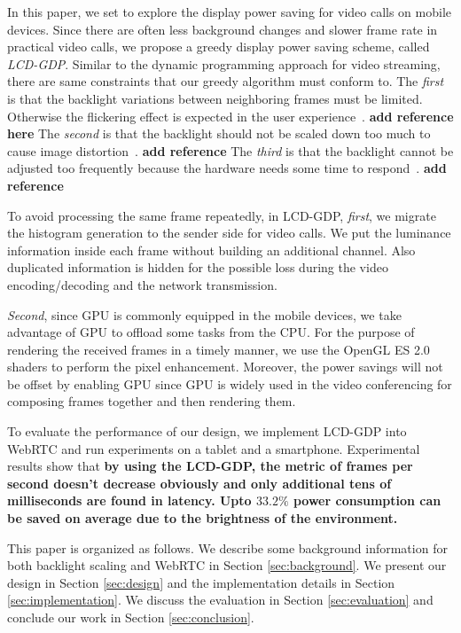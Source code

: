 In this paper, we set to explore the display power saving for video
calls on mobile devices. Since there are often less background changes
and slower frame rate in practical video calls, we propose a greedy
display power saving scheme, called {\it LCD-GDP}.  Similar to the dynamic programming
approach for video streaming, there are same constraints that our
greedy algorithm must conform to. The {\it first} is that the backlight
variations between neighboring frames must be limited. Otherwise the flickering effect is expected
in the user experience~\cite{}. {\bf add reference here} The {\it second} is that the backlight should not be
scaled down too much to cause image distortion~\cite{}. {\bf add
  reference}  The {\em third} is that the
backlight cannot be adjusted too frequently because the hardware needs some time
to respond~\cite{}. {\bf add reference}


To avoid processing the same frame repeatedly, in LCD-GDP, {\it first}, we migrate
the histogram generation to the sender side for video calls. We
put the luminance information inside each frame without building an
additional channel. Also duplicated information is hidden for the
possible loss during the video encoding/decoding and the network
transmission.

{\it Second}, since GPU is commonly equipped in the mobile devices, we
take advantage of GPU to offload some tasks from the
CPU. For the purpose of rendering the received frames in a timely
manner, we use the OpenGL ES 2.0 shaders to perform the pixel
enhancement.  Moreover, the power savings will not be offset by
enabling GPU since GPU is widely used in the video conferencing for
composing frames together and then rendering them.

To evaluate the performance of our design, we implement LCD-GDP into
WebRTC and run experiments on a tablet and a smartphone. Experimental
results show that {\bf by using the LCD-GDP, the metric of frames per
  second doesn't decrease obviously and only additional tens of
  milliseconds are found in latency. Upto $33.2\%$ power consumption
  can be saved on average due to the brightness of the
  environment. }

This paper is organized as follows. We describe some background
information for both backlight scaling and WebRTC 
in Section \ref{sec:background}. We present
our design in Section \ref{sec:design} and the implementation details
in Section \ref{sec:implementation}. We discuss
the evaluation in Section \ref{sec:evaluation} and conclude our work
in Section \ref{sec:conclusion}.


